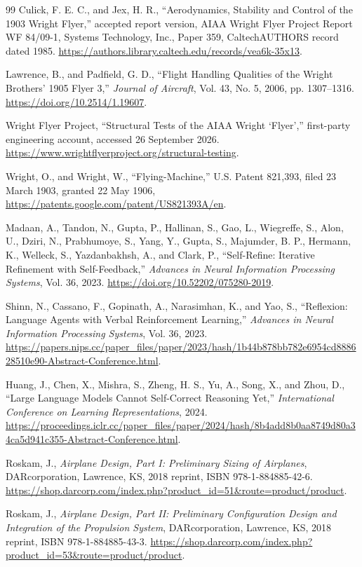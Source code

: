 \begin{thebibliography}{99}
 Culick, F. E. C., and Jex, H. R., ``Aerodynamics, Stability and Control of the 1903 Wright Flyer,'' accepted report version, AIAA Wright Flyer Project Report WF 84/09-1, Systems Technology, Inc., Paper 359, CaltechAUTHORS record dated 1985. \url{https://authors.library.caltech.edu/records/vea6k-35x13}.

 Lawrence, B., and Padfield, G. D., ``Flight Handling Qualities of the Wright Brothers' 1905 Flyer 3,'' \emph{Journal of Aircraft}, Vol. 43, No. 5, 2006, pp. 1307--1316. \url{https://doi.org/10.2514/1.19607}.

 Wright Flyer Project, ``Structural Tests of the AIAA Wright `Flyer','' first-party engineering account, accessed 26 September 2026. \url{https://www.wrightflyerproject.org/structural-testing}.

 Wright, O., and Wright, W., ``Flying-Machine,'' U.S. Patent 821,393, filed 23 March 1903, granted 22 May 1906, \url{https://patents.google.com/patent/US821393A/en}.

 Madaan, A., Tandon, N., Gupta, P., Hallinan, S., Gao, L., Wiegreffe, S., Alon, U., Dziri, N., Prabhumoye, S., Yang, Y., Gupta, S., Majumder, B. P., Hermann, K., Welleck, S., Yazdanbakhsh, A., and Clark, P., ``Self-Refine: Iterative Refinement with Self-Feedback,'' \emph{Advances in Neural Information Processing Systems}, Vol. 36, 2023. \url{https://doi.org/10.52202/075280-2019}.

 Shinn, N., Cassano, F., Gopinath, A., Narasimhan, K., and Yao, S., ``Reflexion: Language Agents with Verbal Reinforcement Learning,'' \emph{Advances in Neural Information Processing Systems}, Vol. 36, 2023. \url{https://papers.nips.cc/paper_files/paper/2023/hash/1b44b878bb782e6954cd888628510e90-Abstract-Conference.html}.

 Huang, J., Chen, X., Mishra, S., Zheng, H. S., Yu, A., Song, X., and Zhou, D., ``Large Language Models Cannot Self-Correct Reasoning Yet,'' \emph{International Conference on Learning Representations}, 2024. \url{https://proceedings.iclr.cc/paper_files/paper/2024/hash/8b4add8b0aa8749d80a34ca5d941c355-Abstract-Conference.html}.

 Roskam, J., \emph{Airplane Design, Part I: Preliminary Sizing of Airplanes}, DARcorporation, Lawrence, KS, 2018 reprint, ISBN 978-1-884885-42-6. \url{https://shop.darcorp.com/index.php?product_id=51&route=product/product}.

 Roskam, J., \emph{Airplane Design, Part II: Preliminary Configuration Design and Integration of the Propulsion System}, DARcorporation, Lawrence, KS, 2018 reprint, ISBN 978-1-884885-43-3. \url{https://shop.darcorp.com/index.php?product_id=53&route=product/product}.


\end{thebibliography}

